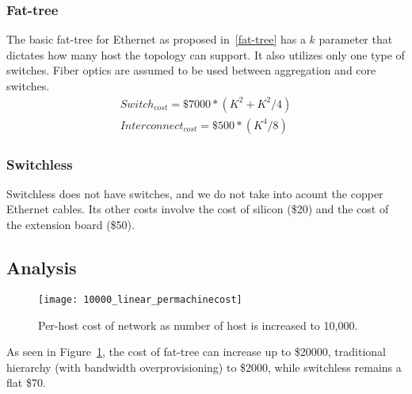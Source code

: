 \subsubsection{Fat-tree}
The basic fat-tree for Ethernet as proposed in~\ref{fat-tree} has a $k$ parameter that dictates how many host the topology can support. It also utilizes only one type of switches. Fiber optics are assumed to be used between aggregation and core switches.
\vspace{-0.1in}
\begin{align}
Switch_{cost} = \$7000 * (K^2 + K^2 / 4) \\
Interconnect_{cost} = \$500 * (K^4 / 8)
\end{align}
\subsubsection{Switchless}
Switchless does not have switches, and we do not take into acount the copper Ethernet cables. Its other costs involve the cost of silicon (\$20) and the cost of the extension board (\$50).

\subsection{Analysis}

\captionsetup[subfloat]{captionskip=-0.003in}
\begin{figure}
    \centering
    \texttt{[image: 10000\_linear\_permachinecost]}
    \vspace{-0.1in}
    \caption{Per-host cost of network as number of host is increased to 10,000.}
    \label{fig:cost_perhost}
\end{figure}

As seen in Figure~\ref{fig:cost_perhost}, the cost of fat-tree can increase up to \$20000, traditional hierarchy (with bandwidth overprovisioning) to \$2000, while switchless remains a flat \$70.

